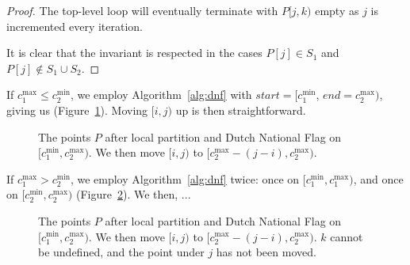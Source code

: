 \begin{proof}
    The top-level loop will eventually terminate with $P[j, k)$ empty as 
    $j$ is incremented every iteration. 

    It is clear that the invariant is respected in the cases $P[j] \in S_1$
    and $P[j] \notin S_1 \cup S_2$.
\end{proof}

If $c_1^{\max} \leq c_2^{\min}$, we employ Algorithm~\ref{alg:dnf} with
$start = [c_1^{\min}$, $end = c_2^{\max})$, giving us 
(Figure~\ref{fig:dnf_cleanup1}). Moving $[i, j)$ up is then straightforward.

\begin{figure}[ht]
    \caption{The points $P$ after local partition and Dutch National Flag
             on $[c_1^{\min}, c_2^{\max})$. We then move $[i, j)$ to
             $[c_2^{\max} - (j - i), c_2^{\max})$.}
    \label{fig:dnf_cleanup1}
\end{figure}

If $c_1^{\max} > c_2^{\min}$, we employ Algorithm~\ref{alg:dnf} twice: once
on $[c_1^{\min}, c_1^{\max})$, and once on $[c_2^{\min}, c_2^{\max})$
(Figure~\ref{fig:dnf_cleanup2}). We then, ...

\begin{figure}[ht]
    \caption{The points $P$ after local partition and Dutch National Flag
             on $[c_1^{\min}, c_2^{\max})$. We then move $[i, j)$ to
             $[c_2^{\max} - (j - i), c_2^{\max})$.
             $k$ cannot be undefined, and the point under $j$ has not been 
             moved.}
    \label{fig:dnf_cleanup2}
\end{figure}

